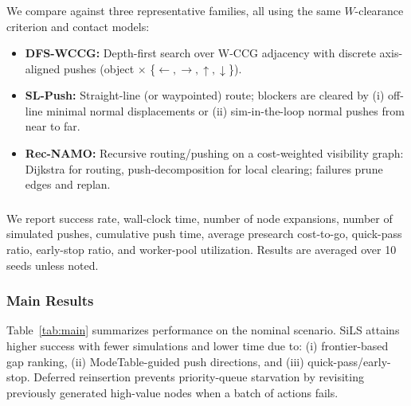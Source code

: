 \subsubsection{}
\label{subsec:baselines}
We compare against three representative families, all using the same
$W$-clearance criterion and contact models:

\begin{itemize}\itemsep2pt
  \item \textbf{DFS-WCCG:} Depth-first search over W-CCG adjacency with
  discrete axis-aligned pushes (object $\times$ \{$\leftarrow,\rightarrow,\uparrow,\downarrow$\}).
  \item \textbf{SL-Push:} Straight-line (or waypointed) route; blockers are
  cleared by (i) off-line minimal normal displacements or
  (ii) sim-in-the-loop normal pushes from near to far.
  \item \textbf{Rec-NAMO:} Recursive routing/pushing on a cost-weighted
  visibility graph: Dijkstra for routing, push-decomposition for local
  clearing; failures prune edges and replan.
\end{itemize}

\subsubsection{}
\label{subsec:metrics}
We report success rate, wall-clock time, number of node expansions,
number of simulated pushes, cumulative push time, average presearch
cost-to-go, quick-pass ratio, early-stop ratio, and worker-pool
utilization. Results are averaged over 10 seeds unless noted.

\subsubsection{Main Results}
\label{subsec:main-results}
Table~\ref{tab:main} summarizes performance on the nominal scenario.
SiLS attains higher success with fewer simulations and lower time due to:
(i) frontier-based gap ranking, (ii) ModeTable-guided push directions,
and (iii) quick-pass/early-stop. Deferred reinsertion prevents
priority-queue starvation by revisiting previously generated high-value
nodes when a batch of actions fails.

